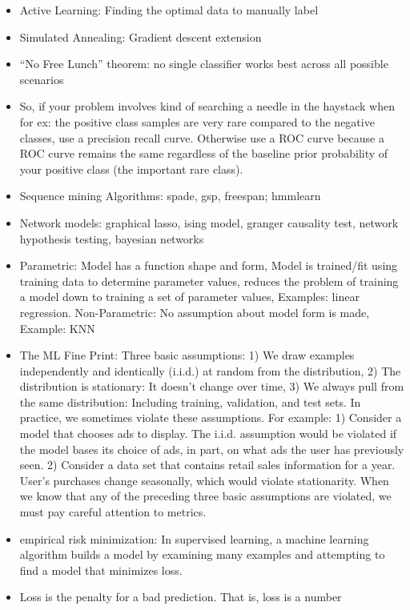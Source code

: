 \documentclass[]{book}
\theoremstyle{definition}
\theoremstyle{definition}
\theoremstyle{definition}
\theoremstyle{remark}
\begin{document}
\begin{itemize}
\item
  Active Learning: Finding the optimal data to manually label
\item
  Simulated Annealing: Gradient descent extension
\item
  ``No Free Lunch'' theorem: no single classifier works best across all
  possible scenarios
\item
  So, if your problem involves kind of searching a needle in the
  haystack when for ex: the positive class samples are very rare
  compared to the negative classes, use a precision recall curve.
  Otherwise use a ROC curve because a ROC curve remains the same
  regardless of the baseline prior probability of your positive class
  (the important rare class).
\item
  Sequence mining Algorithms: spade, gsp, freespan; hmmlearn
\item
  Network models: graphical lasso, ising model, granger causality test,
  network hypothesis testing, bayesian networks
\item
  Parametric: Model has a function shape and form, Model is trained/fit
  using training data to determine parameter values, reduces the problem
  of training a model down to training a set of parameter values,
  Examples: linear regression. Non-Parametric: No assumption about model
  form is made, Example: KNN
\item
  The ML Fine Print: Three basic assumptions: 1) We draw examples
  independently and identically (i.i.d.) at random from the
  distribution, 2) The distribution is stationary: It doesn't change
  over time, 3) We always pull from the same distribution: Including
  training, validation, and test sets. In practice, we sometimes violate
  these assumptions. For example: 1) Consider a model that chooses ads
  to display. The i.i.d. assumption would be violated if the model bases
  its choice of ads, in part, on what ads the user has previously seen.
  2) Consider a data set that contains retail sales information for a
  year. User's purchases change seasonally, which would violate
  stationarity. When we know that any of the preceding three basic
  assumptions are violated, we must pay careful attention to metrics.
\item
  empirical risk minimization: In supervised learning, a machine
  learning algorithm builds a model by examining many examples and
  attempting to find a model that minimizes loss.
\item
  Loss is the penalty for a bad prediction. That is, loss is a number

\end{itemize}
\end{document}
